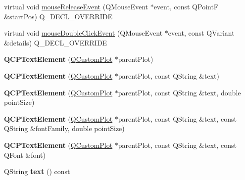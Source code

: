 \begin{DoxyCompactItemize}
\item 
virtual void \hyperlink{class_q_c_p_text_element_acfcbaf9b1da18745e72726aafb39c855}{mouse\+Release\+Event} (Q\+Mouse\+Event $\ast$event, const Q\+PointF \&start\+Pos) Q\+\_\+\+D\+E\+C\+L\+\_\+\+O\+V\+E\+R\+R\+I\+DE
\item 
virtual void \hyperlink{class_q_c_p_text_element_a2272ff775ab385f612e9fd39773de7c0}{mouse\+Double\+Click\+Event} (Q\+Mouse\+Event $\ast$event, const Q\+Variant \&details) Q\+\_\+\+D\+E\+C\+L\+\_\+\+O\+V\+E\+R\+R\+I\+DE
\item 
\mbox{\label{class_q_c_p_text_element_ae1de18bdb1e7ba959f132018dd9a0258}} 
{\bfseries Q\+C\+P\+Text\+Element} (\hyperlink{class_q_custom_plot}{Q\+Custom\+Plot} $\ast$parent\+Plot)
\item 
\mbox{\label{class_q_c_p_text_element_a00f08a8a3363ad8d7d12ca0db4922b6b}} 
{\bfseries Q\+C\+P\+Text\+Element} (\hyperlink{class_q_custom_plot}{Q\+Custom\+Plot} $\ast$parent\+Plot, const Q\+String \&text)
\item 
\mbox{\label{class_q_c_p_text_element_a2684e65def4a5daf80be9f5f149ca9b2}} 
{\bfseries Q\+C\+P\+Text\+Element} (\hyperlink{class_q_custom_plot}{Q\+Custom\+Plot} $\ast$parent\+Plot, const Q\+String \&text, double point\+Size)
\item 
\mbox{\label{class_q_c_p_text_element_adb4bcd3743dbfabfedee4fe9c2ee93da}} 
{\bfseries Q\+C\+P\+Text\+Element} (\hyperlink{class_q_custom_plot}{Q\+Custom\+Plot} $\ast$parent\+Plot, const Q\+String \&text, const Q\+String \&font\+Family, double point\+Size)
\item 
\mbox{\label{class_q_c_p_text_element_a00b75787b77b39bbd083813c2a7b2520}} 
{\bfseries Q\+C\+P\+Text\+Element} (\hyperlink{class_q_custom_plot}{Q\+Custom\+Plot} $\ast$parent\+Plot, const Q\+String \&text, const Q\+Font \&font)
\item 
\mbox{\label{class_q_c_p_text_element_a453c24723b76fdcae405a8a7b0d02614}} 
Q\+String {\bfseries text} () const
\item 
\mbox{\label{class_q_c_p_text_element_a1937ed3b7454d7e815f6027895a7d480}} 

\end{DoxyCompactItemize}
